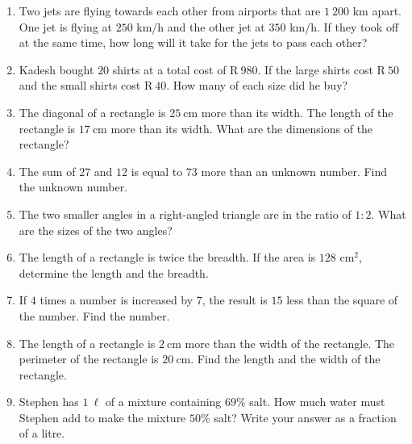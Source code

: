 \begin{exercises}{}
{
\begin{enumerate}[noitemsep, label=\textbf{\arabic*}. ] 
\item Two jets are flying towards each other from airports that are $1~200$ km apart. One jet is flying at $250$ km/h and the other jet at $350$ km/h. If they took off at the same time, how long will it take for the jets to pass each other?
\item Kadesh bought $20$ shirts at a total cost of R$~980$. If the
  large shirts cost R$~50$ and the small shirts cost R$~40$. How many
  of each size did he buy?
\item The diagonal of a rectangle is $25~$cm more than its width. The length of the rectangle is $17~$cm more than its width. What are the dimensions of the rectangle?  
\item The sum of $27$ and $12$ is equal to $73$ more than an unknown number. Find the unknown number.
\item The two smaller angles in a right-angled triangle are in the ratio of $1:2$. What are the sizes of the two angles? 
\item The length of a rectangle is twice the breadth. If the area is $128$ cm$^{2}$, determine the length and the breadth.       
\item If $4$ times a number is increased by $7$, the result is $15$ less than the square of the number. Find the number.
\item The length of a rectangle is $2~$cm more than the width of the rectangle. The perimeter of the rectangle is $20~$cm. Find the length and the width of the rectangle.
\item Stephen has $1~\ell{}$ of a mixture containing $69\%$ salt. How much water must Stephen add to make the mixture $50\%$ salt? Write your answer as a fraction of a litre.
\end{enumerate}

}
\end{exercises}


